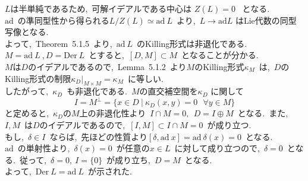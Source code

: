 \documentclass[uplatex,dvipdfmx]{jsarticle}
\begin{document}
\begin{myproof}
    $L$は半単純であるため,~可解イデアルである中心は $Z(L) = 0$ ~となる.\\
    $\text{ad}$~の準同型性から得られる$L/Z(L) \simeq \text{ad}~L$~より,~$L \to \text{ad} L$ はLie代数の同型写像となる.\\
    よって,~Theorem~5.1.5~より,~$\text{ad}~L$~のKilling形式は非退化である.~$M=\text{ad}~L~,D=\text{Der}~L$~とすると,~$[D,M]\subset M$~となることが分かる.\\
    $M$は$D$のイデアルであるので,~Lemma~5.1.2~より$M$のKilling形式$\kappa_M$~は,~$D$のKilling形式の制限$\kappa_D |_{M\times M}=\kappa_M$~に等しい.\\
    したがって,~$\kappa_D$~も非退化である.~$M$の直交補空間を$\kappa_D$ に関して
    \begin{equation*}
        I=M^\perp =\{ x\in D~|~\kappa_D(x,y)=0~~~\forall y\in M \}
    \end{equation*}
    と定めると,~$\kappa_D$の$M$上の非退化性より~$I\cap M=0,~~D=I\oplus M$~となる.~また,~$I,M$~は$D$のイデアルであるので,~$[I,M]\subset I\cap M=0$~が成り立つ.\\
    もし,~$\delta \in I$~ならば,~先ほどの性質より$[\delta,\text{ad}~x]=\text{ad}~\delta(x)=0$~となる.\\
    $\text{ad}$~の単射性より,~$\delta(x)=0$~が任意の$x\in L$~に対して成り立つので,~$\delta =0$~となる.~従って,~$\delta =0,~I=\{0\}$~が成り立ち,~$D=M$~となる.\\
    よって,~$\text{Der}~L = \text{ad}~L$~が示された.
\end{myproof}
\newpage
\end{document}
